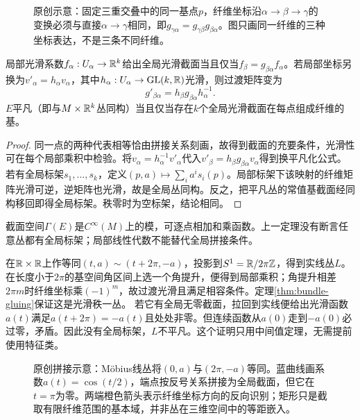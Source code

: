 \begin{figure}[htbp]
\centering
\caption{原创示意：固定三重交叠中的同一基点$p$，纤维坐标沿$\alpha\to\beta\to\gamma$的变换必须与直接$\alpha\to\gamma$相同，即$g_{\gamma\alpha}=g_{\gamma\beta}g_{\beta\alpha}$。图只画同一纤维的三种坐标表达，不是三条不同纤维。}
\label{fig:bundle-cocycle}
\end{figure}
\begin{proposition}\label{prop:bundle-sections}
局部光滑系数$f_\alpha:U_\alpha\to\mathbb{R}^k$给出全局光滑截面当且仅当$f_\beta=g_{\beta\alpha}f_\alpha$。若局部坐标另换为$v'_\alpha=h_\alpha v_\alpha$，其中$h_\alpha:U_\alpha\to\operatorname{GL}(k,\mathbb{R})$光滑，则过渡矩阵变为
\[
 g'_{\beta\alpha}=h_\beta g_{\beta\alpha}h_\alpha^{-1}.
\]
$E$平凡（即与$M\times\mathbb{R}^k$丛同构）当且仅当存在$k$个全局光滑截面在每点组成纤维的基。
\end{proposition}
\begin{proof}
同一点的两种代表相等恰由拼接关系刻画，故得到截面的充要条件，光滑性可在每个局部乘积中检验。将$v_\alpha=h_\alpha^{-1}v'_\alpha$代入$v'_\beta=h_\beta g_{\beta\alpha}v_\alpha$得到换平凡化公式。
若有全局标架$s_1,\ldots,s_k$，定义$(p,a)\mapsto\sum_i a^is_i(p)$。局部标架下该映射的纤维矩阵光滑可逆，逆矩阵也光滑，故是全局丛同构。反之，把平凡丛的常值基截面经同构移回即得全局标架。秩零时为空标架，结论相同。
\end{proof}
截面空间$\Gamma(E)$是$C^\infty(M)$上的模，可逐点相加和乘函数。上一定理没有断言任意丛都有全局标架；局部线性代数不能替代全局拼接条件。
\begin{example}[Möbius线丛]\label{ex:mobius-line}
在$\mathbb{R}\times\mathbb{R}$上作等同$(t,a)\sim(t+2\pi,-a)$，投影到$S^1=\mathbb{R}/2\pi\mathbb Z$，得到实线丛$L$。在长度小于$2\pi$的基空间角区间上选一个角提升，便得到局部乘积；角提升相差$2\pi m$时纤维坐标乘$(-1)^m$，故过渡光滑且满足相容条件。定理\ref{thm:bundle-gluing}保证这是光滑秩一丛。
若它有全局无零截面，拉回到实线便给出光滑函数$a(t)$满足$a(t+2\pi)=-a(t)$且处处非零。但连续函数从$a(0)$走到$-a(0)$必过零，矛盾。因此没有全局标架，$L$不平凡。这个证明只用中间值定理，无需提前使用特征类。
\end{example}
\begin{figure}[htbp]
\centering
\caption{原创拼接示意：Möbius线丛将$(0,a)$与$(2\pi,-a)$等同。蓝曲线画系数$a(t)=\cos(t/2)$，端点按反号关系拼接为全局截面，但它在$t=\pi$为零。两端橙色箭头表示纤维坐标方向的反向识别；矩形只是截取有限纤维范围的基本域，并非丛在三维空间中的等距嵌入。}
\label{fig:mobius-gluing}
\end{figure}
